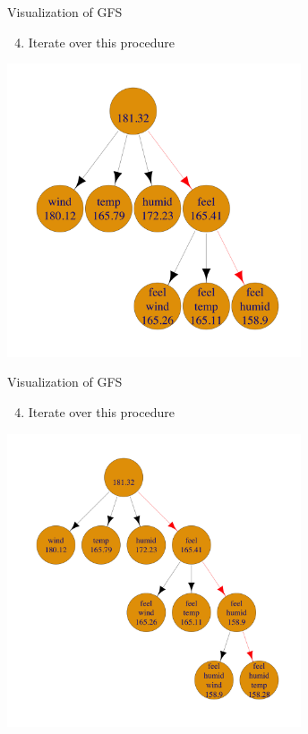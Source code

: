 \documentclass[11pt,compress,t,notes=noshow, xcolor=table]{beamer}
\begin{document}
\begin{frame}[noframenumbering]{Visualization of GFS}
\begin{enumerate}
    \setcounter{enumi}{3}
    \item Iterate over this procedure
\end{enumerate}
    \begin{center}
      \includegraphics[width = 0.65\textwidth]{sl/feature-selection/figure/fs-wrappers-powerset-tree-2.png}
      \end{center}
\end{frame}

\begin{frame}[noframenumbering]{Visualization of GFS}
\begin{enumerate}
    \setcounter{enumi}{3}
    \item Iterate over this procedure
\end{enumerate}

    \begin{center}
      \includegraphics[width = 0.65\textwidth]{sl/feature-selection/figure/fs-wrappers-powerset-tree-3.png}
    \end{center}
\end{frame}
\end{document}
